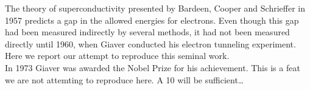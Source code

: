 
The theory of superconductivity presented by Bardeen, Cooper and Schrieffer in 1957 predicts a gap in the allowed energies for electrons. Even though this gap had been measured indirectly by several methods, it had not been measured directly until 1960, when Giaver conducted his electron tunneling experiment. Here we report our attempt to reproduce this seminal work.\\
In 1973 Giaver was awarded the Nobel Prize for his achievement. This is a feat we are not attemting to reproduce here. A 10 will be sufficient\dots
